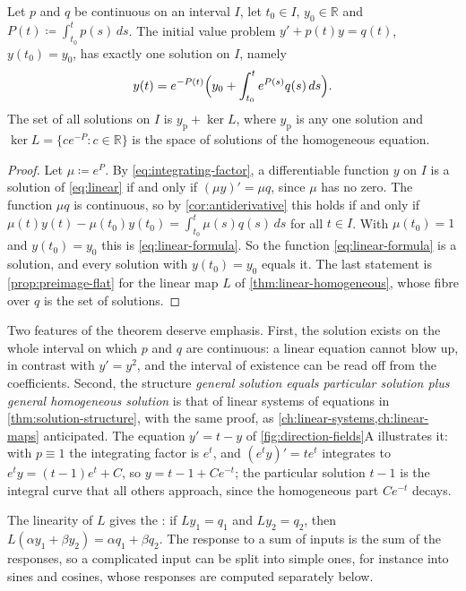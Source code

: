 \begin{theorem}
\label{thm:linear-first-order}
Let $p$ and $q$ be continuous on an interval $I$, let $t_0\in I$, $y_0\in\mathbb R$ and $P(t)\coloneqq\int_{t_0}^tp(s)\,ds$. The initial value problem $y'+p(t)y=q(t)$, $y(t_0)=y_0$, has exactly one solution on $I$, namely
\begin{equation}
y(t)=e^{-P(t)}\Bigl(y_0+\int_{t_0}^te^{P(s)}q(s)\,ds\Bigr).
\label{eq:linear-formula}
\end{equation}
The set of all solutions on $I$ is $y_{\mathrm p}+\ker L$, where $y_{\mathrm p}$ is any one solution and $\ker L=\{ce^{-P}:c\in\mathbb R\}$ is the space of solutions of the homogeneous equation.
\end{theorem}

\begin{proof}
Let $\mu\coloneqq e^P$. By \eqref{eq:integrating-factor}, a differentiable function $y$ on $I$ is a solution of \eqref{eq:linear} if and only if $(\mu y)'=\mu q$, since $\mu$ has no zero. The function $\mu q$ is continuous, so by \cref{cor:antiderivative} this holds if and only if $\mu(t)y(t)-\mu(t_0)y(t_0)=\int_{t_0}^t\mu(s)q(s)\,ds$ for all $t\in I$. With $\mu(t_0)=1$ and $y(t_0)=y_0$ this is \eqref{eq:linear-formula}. So the function \eqref{eq:linear-formula} is a solution, and every solution with $y(t_0)=y_0$ equals it. The last statement is \cref{prop:preimage-flat} for the linear map $L$ of \cref{thm:linear-homogeneous}, whose fibre over $q$ is the set of solutions.
\end{proof}

Two features of the theorem deserve emphasis. First, the solution exists on the whole interval on which $p$ and $q$ are continuous: a linear equation cannot blow up, in contrast with $y'=y^2$, and the interval of existence can be read off from the coefficients. Second, the structure \emph{general solution equals particular solution plus general homogeneous solution} is that of linear systems of equations in \cref{thm:solution-structure}, with the same proof, as \cref{ch:linear-systems,ch:linear-maps} anticipated. The equation $y'=t-y$ of \cref{fig:direction-fields}A illustrates it: with $p\equiv1$ the integrating factor is $e^t$, and $(e^ty)'=te^t$ integrates to $e^ty=(t-1)e^t+C$, so $y=t-1+Ce^{-t}$; the particular solution $t-1$ is the integral curve that all others approach, since the homogeneous part $Ce^{-t}$ decays.

The linearity of $L$ gives the : if $Ly_1=q_1$ and $Ly_2=q_2$, then $L(\alpha y_1+\beta y_2)=\alpha q_1+\beta q_2$. The response to a sum of inputs is the sum of the responses, so a complicated input can be split into simple ones, for instance into sines and cosines, whose responses are computed separately below.

